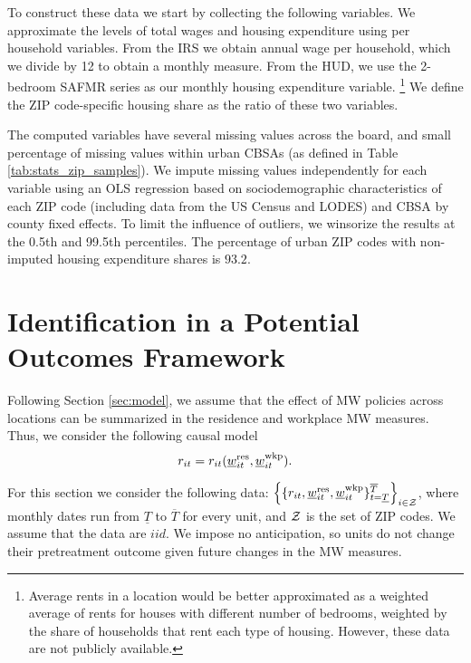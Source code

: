 To construct these data we start by collecting the following variables.
We approximate the levels of total wages and housing expenditure using per 
household variables.
From the IRS we obtain annual wage per household, which we 
divide by 12 to obtain a monthly measure.
From the HUD, we use the 2-bedroom SAFMR series as our monthly housing 
expenditure variable.%
\footnote{Average rents in a location would be better approximated as a
weighted average of rents for houses with different number of bedrooms,
weighted by the share of households that rent each type of housing.
However, these data are not publicly available.}
We define the ZIP code-specific housing share as the ratio of these two 
variables.

The computed variables have several missing values across the board, and 
small percentage of missing values within urban CBSAs 
(as defined in Table \ref{tab:stats_zip_samples}).
We impute missing values independently for each variable using an OLS
regression based on sociodemographic characteristics of each ZIP code 
(including data from the US Census and LODES) and CBSA by county fixed effects.
To limit the influence of outliers, we winsorize the results at the 0.5th and 
99.5th percentiles. 
The percentage of urban ZIP codes with non-imputed housing expenditure shares 
is $93.2$.

\clearpage
\section{Identification in a Potential Outcomes Framework}
\label{sec:potential_outcomes}

Following Section \ref{sec:model}, we assume that the effect of MW policies 
across locations can be summarized in the residence and workplace MW measures.
Thus, we consider the following causal model
\begin{equation}\label{eq:causal_model}
    r_{it} = r_{it}(\underline{w}_{it}^{\text{res}}, \underline{w}_{it}^{\text{wkp}}) .
\end{equation}

For this section we consider the following data:
$\left\{\{r_{it}, \underline{w}^{\text{res}}_{it}, \underline{w}^{\text{wkp}}_{it}\}
       _{t=\underline{T}}^{\overline{T}}\right\}_{i\in\mathcal{Z}}$,
where monthly dates run from $\underline{T}$ to $\overline{T}$ for every unit,
and $\mathcal{Z}$ is the set of ZIP codes.
We assume that the data are $iid$.
We impose no anticipation, so units do not change their pretreatment outcome 
given future changes in the MW measures.

